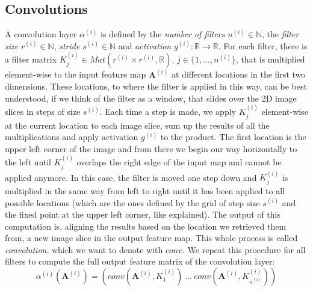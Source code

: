 \documentclass[12pt]{report}
\theoremstyle{definition}
\begin{document}
\subsection{Convolutions}

A convolution layer $\alpha^{(i)}$ is defined by the \emph{number of filters} $n^{(i)} \in \mathbb{N}$, the \emph{filter size} $r^{(i)}\in \mathbb{N}$, \emph{stride} $s^{(i)} \in \mathbb{N}$ and \emph{activation} $g^{(i)}: \mathbb{R} \rightarrow \mathbb{R}$. 
For each filter, there is a filter matrix $K^{(i)}_j \in Mat(r^{(i)} \times r^{(i)}, \mathbb{R})$, $j \in \{ 1, ..., n^{(i)}\}$,  that is multiplied element-wise to the input feature map $\mathbf{A}^{(i)}$ at different locations in the first two dimensions. These locations, to where the filter is applied in this way, can be best understood, if we think of the filter as a window, that slides over the 2D image slices in steps of size $s^{(i)}$. Each time a step is made, we apply $K^{(i)}_j$ element-wise at the current location to each image slice, sum up the results of all the multiplications and apply activation $g^{(i)}$ to the product. 
The first location is the upper left corner of the image and from there we begin our way horizontally to the left until $K^{(i)}_j$ overlaps the right edge of the input map and cannot be applied anymore. In this case, the filter is moved one step down and $K^{(i)}_j$ is multiplied in the same way from left to right until it has been applied to all possible locations (which are the ones defined by the grid of step size $s^{(i)}$ and the fixed point at the upper left corner, like explained). 
The output of this computation is, aligning the results based on the location we retrieved them from, a new image slice in the output feature map. This whole process is called \emph{convolution}, which we want to denote with $conv$. We repeat this procedure for all filters to compute the full output feature matrix of the convolution layer:
\begin{equation}
\alpha^{(i)}(\mathbf{A}^{(i)}) = (conv(\mathbf{A}^{(i)}, K^{(i)}_1) \ ... \ conv(\mathbf{A}^{(i)}, K^{(i)}_{n^{(i)}})) 
\end{equation}
\end{document}
